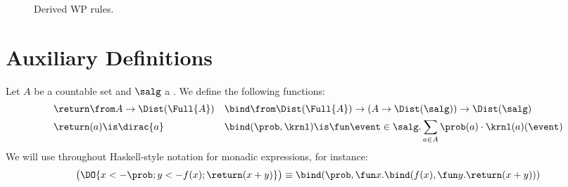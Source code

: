 \documentclass[acmsmall,nonacm,screen,appendix]{acmart}
\begin{document}
\begin{figure}[tp]
\adjustfigure[\small]
\begin{proofrules}
         \label{rule:wp-loop-0}

         \label{rule:wp-loop-lockstep}

         \label{rule:wp-rl-assign}

         \label{rule:wp-if-unary}
  \end{proofrules}
\caption{Derived WP rules.}
\label{fig:derived-wp-rules}
\end{figure}
 \section{Auxiliary Definitions}
\label{sec:appendix:definition}

\begin{definition}
  Let $A$ be a countable set and $\salg$ a \salgebra.
  We define the following functions:
  \begin{align*}
    \return &\from A \to \Dist(\Full{A})
    &
    \bind &\from
      \Dist(\Full{A}) \to
      (A \to \Dist(\salg))
        \to \Dist(\salg)
    \\
    \return&(a) \is \dirac{a}
    &
    \bind&(\prob, \krnl) \is
      \fun \event \in \salg.
\sum_{a\in A} \prob(a) \cdot \krnl(a)(\event)
  \end{align*}
  We will use throughout Haskell-style notation for monadic expressions,
  for instance:
  \[
    \bigl(\DO{x <- \prob; y <- f(x); \return(x+y)}\bigr)
    \equiv
    \bind(\prob,
      \fun x.
        \bind(f(x),
          \fun y.
            \return(x+y)
        )
    )
  \]
\end{definition}
\end{document}

